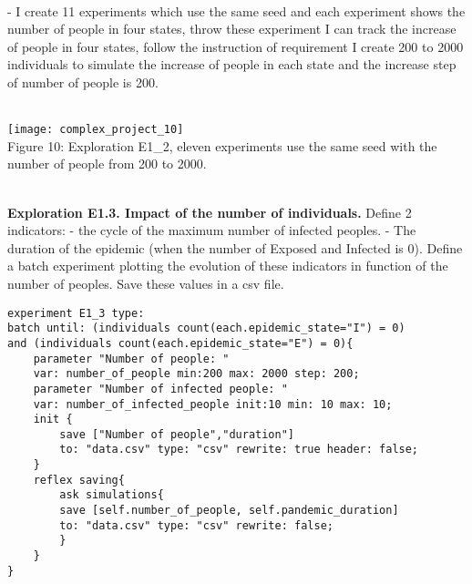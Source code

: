 \documentclass{article}
\begin{document}
\\- I create 11 experiments which use the same seed and each experiment shows the number of people in four states, throw these experiment I can track the increase of people in four states, follow the instruction of requirement I create 200 to 2000 individuals to simulate the increase of people in each state and the increase step of number of people is 200.

\\
\texttt{[image: complex\_project\_10]}
\\
\caption{Figure 10: Exploration E1\_2, eleven experiments use the same seed with the number of people from 200 to 2000.}
\\

\textbf{Exploration E1.3. Impact of the number of individuals.}
Define 2 indicators:
- the cycle of the maximum number of infected peoples.
- The duration of the epidemic (when the number of Exposed and Infected is
0).
Define a batch experiment plotting the evolution of these indicators in function
of the number of peoples. Save these values in a csv file.
\begin{lstlisting}
experiment E1_3 type: 
batch until: (individuals count(each.epidemic_state="I") = 0) 
and (individuals count(each.epidemic_state="E") = 0){
	parameter "Number of people: " 
	var: number_of_people min:200 max: 2000 step: 200;
	parameter "Number of infected people: " 
	var: number_of_infected_people init:10 min: 10 max: 10;
	init {
		save ["Number of people","duration"] 
		to: "data.csv" type: "csv" rewrite: true header: false;
	}
	reflex saving{
		ask simulations{
		save [self.number_of_people, self.pandemic_duration] 
		to: "data.csv" type: "csv" rewrite: false;
		}
	}
}
\end{lstlisting}
\end{document}
